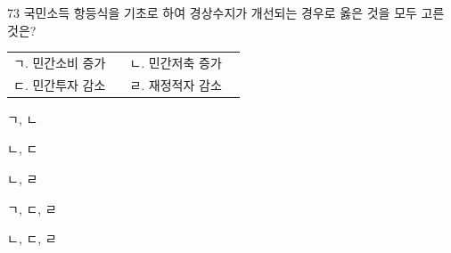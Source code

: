 \begin{question}{73}
국민소득 항등식을 기초로 하여 경상수지가 개선되는 경우로 옳은 것을 모두 고른 것은?
\begin{framedtext}
\begin{tabular}{@{}p{0.45\linewidth}p{0.45\linewidth}@{}}
ㄱ. 민간소비 증가 & ㄴ. 민간저축 증가 \\
ㄷ. 민간투자 감소 & ㄹ. 재정적자 감소
\end{tabular}
\end{framedtext}
\begin{choices}
  \item ㄱ, ㄴ
  \item ㄴ, ㄷ
  \item ㄴ, ㄹ
  \item ㄱ, ㄷ, ㄹ
  \item ㄴ, ㄷ, ㄹ
\end{choices}
\end{question}
